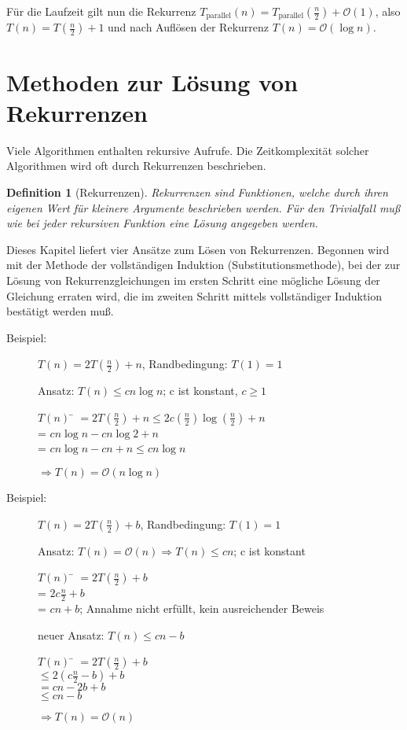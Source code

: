 \documentclass[ngerman,draft,parskip=half*,twoside]{scrreprt}
\theoremstyle{break}
\newtheorem{definition}{Definition}[chapter]
\theoremstyle{nonumberbreak}
\newcommand*{\OO}{\mathcal{O}}      %
\begin{document}
$  $

Für die Laufzeit gilt nun die Rekurrenz $T_{\text{parallel}}(n) =
T_{\text{parallel}}(\frac{n}{2}) + \OO(1)$, also $T(n)=
T(\frac{n}{2})+1$ und nach Auflösen der Rekurrenz $T(n) = \OO(\log
n)$.

\section{Methoden zur Lösung von Rekurrenzen}
Viele Algorithmen enthalten rekursive Aufrufe. Die Zeitkomplexität solcher Algorithmen wird oft durch Rekurrenzen beschrieben.
\begin{definition}[Rekurrenzen]
Rekurrenzen sind Funktionen, welche durch ihren eigenen Wert für kleinere Argumente beschrieben werden. Für den Trivialfall muß wie
bei jeder rekursiven Funktion eine Lösung angegeben werden.
\end{definition}
Dieses Kapitel liefert vier Ansätze zum Lösen von Rekurrenzen.
%
%
Begonnen wird mit der Methode der vollständigen Induktion (Substitutionsmethode),
bei der zur Lösung von Rekurrenzgleichungen im ersten Schritt eine mögliche Lösung der Gleichung erraten wird,
die im zweiten Schritt mittels vollständiger Induktion bestätigt werden muß.		

	\begin{description}
		\item [Beispiel:] $T(n) = 2 T\left(\frac{n}{2}\right) + n$, Randbedingung: $T(1)=1$

		Ansatz: $T(n) \leq c n \log n$; c ist konstant, $c \geq 1$
		\begin{tabbing}
			$T(n)$ \= $= 2 T\left(\frac{n}{2}\right)+n\leq 2 c \left(\frac{n}{2}\right) \log\left(\frac{n}{2}\right)+n$\\
			\> = $c n \log n-c n \log 2+n$\\
			\> = $c n \log n-c n+n \leq c n \log n$\\
		\end{tabbing}
		$\Rightarrow T(n)=\OO(n \log n)$
	\end{description}

	\begin{description}
		\item [Beispiel:] $T(n) = 2 T\left(\frac{n}{2}\right) + b$, Randbedingung: $T(1)=1$

		Ansatz: $T(n)=\OO(n)\Rightarrow T(n)\leq c n$; c ist konstant
		\begin{tabbing}
			$T(n)$ \= $= 2 T(\frac{n}{2})+b$\\
			\> = $2c \frac{n}{2} +b$\\
			\> = $c n+b$; Annahme nicht erfüllt, kein ausreichender Beweis
		\end{tabbing}
		neuer Ansatz: $T(n)\leq c n-b$
		\begin{tabbing}
			$T(n)$ \= $=2 T\left(\frac{n}{2} \right)+b$\\
			\> $\leq 2\left(c \frac{n}{2}-b\right)+b$\\
			\> $=c n-2 b+b$\\
			\> $\leq c n-b$
		\end{tabbing}
		$\Rightarrow T(n)=\OO(n)$
	\end{description}
			
\end{document}
